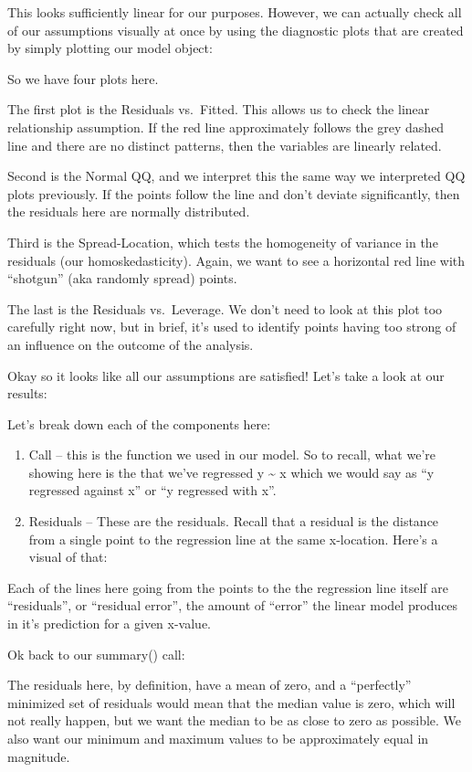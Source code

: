 \documentclass[
]{article}
\begin{document}
This looks sufficiently linear for our purposes. However, we can
actually check all of our assumptions visually at once by using the
diagnostic plots that are created by simply plotting our model object:

So we have four plots here.

The first plot is the Residuals vs.~Fitted. This allows us to check the
linear relationship assumption. If the red line approximately follows
the grey dashed line and there are no distinct patterns, then the
variables are linearly related.

Second is the Normal QQ, and we interpret this the same way we
interpreted QQ plots previously. If the points follow the line and don't
deviate significantly, then the residuals here are normally distributed.

Third is the Spread-Location, which tests the homogeneity of variance in
the residuals (our homoskedasticity). Again, we want to see a horizontal
red line with ``shotgun'' (aka randomly spread) points.

The last is the Residuals vs.~Leverage. We don't need to look at this
plot too carefully right now, but in brief, it's used to identify points
having too strong of an influence on the outcome of the analysis.

Okay so it looks like all our assumptions are satisfied! Let's take a
look at our results:

Let's break down each of the components here:

\begin{enumerate}
\def\labelenumi{\arabic{enumi}.}
\item
  Call -- this is the function we used in our model. So to recall, what
  we're showing here is the that we've regressed y \textasciitilde{} x
  which we would say as ``y regressed against x'' or ``y regressed with
  x''.
\item
  Residuals -- These are the residuals. Recall that a residual is the
  distance from a single point to the regression line at the same
  x-location. Here's a visual of that:
\end{enumerate}

Each of the lines here going from the points to the the regression line
itself are ``residuals'', or ``residual error'', the amount of ``error''
the linear model produces in it's prediction for a given x-value.

Ok back to our summary() call:

The residuals here, by definition, have a mean of zero, and a
``perfectly'' minimized set of residuals would mean that the median
value is zero, which will not really happen, but we want the median to
be as close to zero as possible. We also want our minimum and maximum
values to be approximately equal in magnitude.
\end{document}
